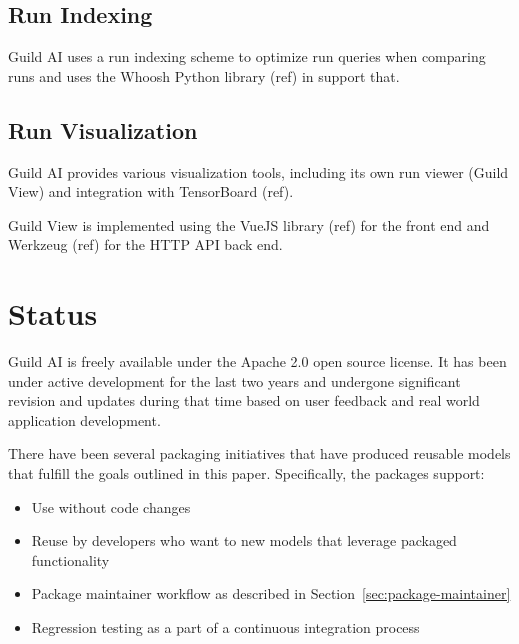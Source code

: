 \documentclass{article}
\begin{document}
\subsection{Run Indexing}

Guild AI uses a run indexing scheme to optimize run queries when
comparing runs and uses the Whoosh Python library (ref) in support
that.

\subsection{Run Visualization}

Guild AI provides various visualization tools, including its own run
viewer (Guild View) and integration with TensorBoard (ref).

Guild View is implemented using the VueJS library (ref) for the front
end and Werkzeug (ref) for the HTTP API back end.
\fi

\section{Status}

Guild AI is freely available under the Apache 2.0 open source
license. It has been under active development for the last two years
and undergone significant revision and updates during that time based
on user feedback and real world application development.

There have been several packaging initiatives that have produced
reusable models \cite{pkg} that fulfill the goals
outlined in this paper. Specifically, the packages support:

\begin{itemize}
\item Use without code changes
\item Reuse by developers who want to new models that leverage
  packaged functionality
\item Package maintainer workflow as described in
  Section~\ref{sec:package-maintainer}
\item Regression testing as a part of a continuous integration process
\end{itemize}



\end{document}
